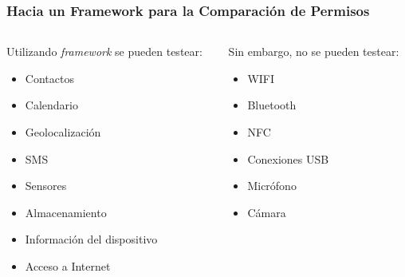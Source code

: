 \begin{frame}
 \frametitle{Hacia un Framework para la Comparación de Permisos}
 \begin{columns}
  \begin{column}[]{.5\textwidth}
   Utilizando \emph{framework} se pueden testear:
   \begin{itemize}
	\item Contactos
	\item Calendario
	\item Geolocalización
	\item SMS
	\item Sensores
	\item Almacenamiento
	\item Información del dispositivo
	\item Acceso a Internet
   \end{itemize}
  \end{column}
  \pause
  \begin{column}[]{.5\textwidth}
   Sin embargo, no se pueden testear:
   \begin{itemize}
    \item \alert {WIFI}
    \item \alert {Bluetooth}
    \item \alert {NFC}
    \item \alert {Conexiones USB}
    \item \alert {Micrófono}
    \item \alert {Cámara}
   \end{itemize}
  \end{column}
 \end{columns}
\end{frame}
